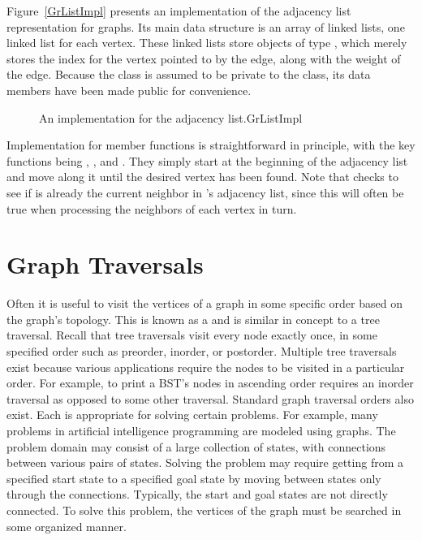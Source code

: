Figure~\ref{GrListImpl} presents an implementation of the adjacency
list representation for graphs.
Its main data structure is an array of linked lists, one linked list
for each vertex.
These linked lists store objects of type , which merely
stores the index for the vertex pointed to by the edge, along with the
weight of the edge.
{Because the  class is assumed to be private to the
 class, its data members have been made public for
convenience.}{}


\begin{figure}
\vspace{-\bigskipamount}

{An implementation for the adjacency list.}{GrListImpl}
\end{figure}

\begin{figure}
\vspace{-\bigskipamount}
\captcont
\end{figure}

Implementation for  member functions is straightforward
in principle, with the key functions being ,
, and .
They simply start at the beginning of the adjacency list and move
along it until the desired vertex has been found.
Note that  checks to see if  is already the
current neighbor in 's adjacency list, since this will often
be true when processing the neighbors of each vertex in turn.

\section{Graph Traversals}
\label{GraphTrav}

Often it is useful to visit the vertices of a graph in some specific
order based on the graph's topology.
This is known as a  and is similar in concept
to a tree traversal.
Recall that tree traversals visit every node exactly once, in some
specified order such as preorder, inorder, or postorder.
Multiple tree traversals exist because various applications require
the nodes to be visited in a particular order.
For example, to print a BST's nodes in ascending order requires an
inorder traversal as opposed to some other
traversal.
Standard graph traversal orders also exist.
Each is appropriate for solving certain problems.
For example, many problems in artificial intelligence programming
are modeled using graphs.
The problem domain may consist of a large collection of states,
with connections between various pairs of states.
Solving the problem may require getting from a specified start
state to a specified goal state by moving between states only
through the connections.
Typically, the start and goal states are not directly connected.
To solve this problem, the vertices of the graph must be searched in
some organized manner.

